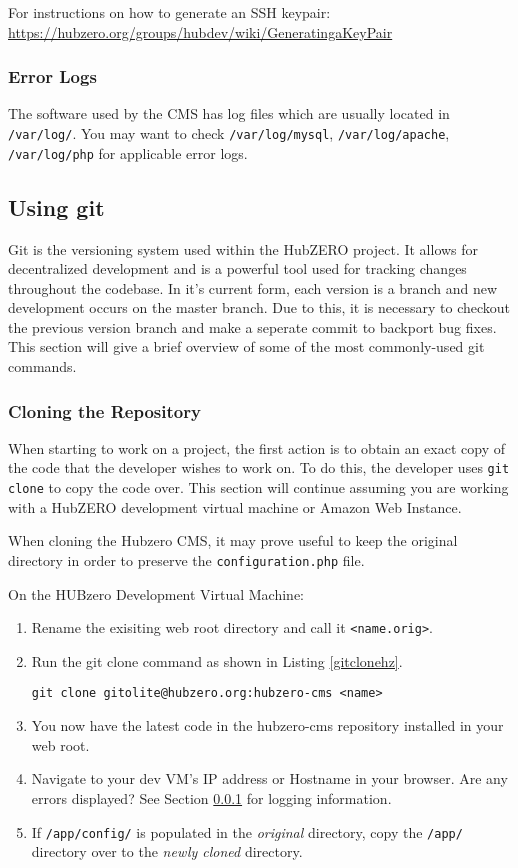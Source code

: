 \documentclass[10pt,letterpaper,titlepage]{article}
\begin{document}
For instructions on how to generate an SSH keypair:
\url{https://hubzero.org/groups/hubdev/wiki/GeneratingaKeyPair}

\subsubsection{Error Logs}
\label{errorlogging}
The software used by the CMS has log files which are usually located in \texttt{/var/log/}. You may want to check \texttt{/var/log/mysql}, \texttt{/var/log/apache}, \texttt{/var/log/php} for applicable
error logs.

\subsection{Using git}
\label{usinggit}
Git is the versioning system used within the HubZERO project. It allows for decentralized development and is a powerful tool used for tracking changes throughout the codebase. In it's current form, each version is a branch and new development occurs on the master branch. Due to this, it is necessary to checkout the previous version branch and make a seperate commit to backport bug fixes. This section will give a brief overview of some of the most commonly-used git commands.

\subsubsection{Cloning the Repository}
When starting to work on a project, the first action is to obtain an exact copy of the code that the developer wishes to work on. To do this, the developer uses \texttt{git clone} to copy the code over. This section will continue assuming you are working with a HubZERO development virtual machine or Amazon Web Instance.

When cloning the Hubzero CMS, it may prove useful to keep the original directory in order to preserve the \texttt{configuration.php} file. 

On the HUBzero Development Virtual Machine:
\begin{enumerate}

\item Rename the exisiting web root directory and call it \texttt{<name.orig>}.
\item Run the git clone command as shown in Listing \ref{gitclonehz}.
\begin{lstlisting}[label=gitclonehz,caption={Incantation for cloning the hubzero-cms repository.}]
git clone gitolite@hubzero.org:hubzero-cms <name>
\end{lstlisting}
\item You now have the latest code in the hubzero-cms repository installed in your web root.
\item Navigate to your dev VM's IP address or Hostname in your browser. Are any errors displayed? See Section \ref{errorlogging} for logging information.
\item If \texttt{/app/config/} is populated in the \emph{original} directory, copy the \texttt{/app/} directory over to the \emph{newly cloned} directory.
\end{enumerate}
\end{document}
